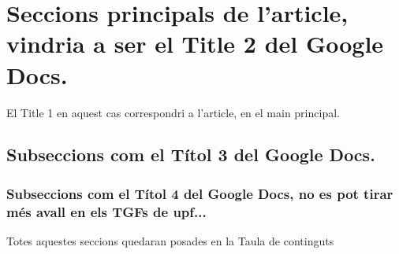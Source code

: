 \section{Seccions principals de l'article, vindria a ser el Title 2 del Google Docs.}
El Title 1 en aquest cas correspondri a l'article,  en el main principal.
\subsection{Subseccions com el Títol 3 del Google Docs.}
\subsubsection{Subseccions com el Títol 4 del Google Docs, no es pot tirar més avall en els TGFs de \acl{upf}...}
Totes aquestes seccions quedaran posades en la Taula de continguts \cite{autor} %
